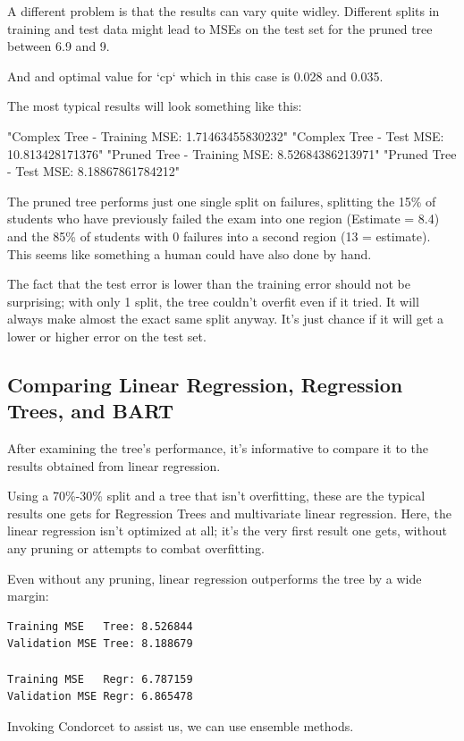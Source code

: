 \documentclass[12pt]{article}
\begin{document}
A different problem is that the results can vary quite widley. Different splits in training and test data might lead to MSEs on the test set for the pruned tree between 6.9 and 9.

And and optimal value for `cp` which in this case is 0.028 and 0.035.


The most typical results will look something like this:

"Complex Tree - Training MSE: 1.71463455830232"
"Complex Tree -     Test MSE: 10.813428171376"
"Pruned Tree  - Training MSE: 8.52684386213971"
"Pruned Tree  -     Test MSE: 8.18867861784212"

The pruned tree performs just one single split on failures, splitting the 15\% of students who have previously failed the exam into one region (Estimate = 8.4) and the 85\% of students with 0 failures into a second region (13 = estimate). This seems like something a human could have also done by hand.

The fact that the test error is lower than the training error should not be surprising; with only 1 split, the tree couldn't overfit even if it tried. It will always make almost the exact same split anyway. It's just chance if it will get a lower or higher error on the test set.



\subsection{Comparing Linear Regression, Regression Trees, and BART}

After examining the tree's performance, it's informative to compare it to the results obtained from linear regression.

Using a 70\%-30\% split and a tree that isn't overfitting, these are the typical results one gets for Regression Trees and multivariate linear regression. Here, the linear regression isn't optimized at all; it's the very first result one gets, without any pruning or attempts to combat overfitting.

Even without any pruning, linear regression outperforms the tree by a wide margin:

\begin{verbatim}
Training MSE   Tree: 8.526844
Validation MSE Tree: 8.188679

Training MSE   Regr: 6.787159
Validation MSE Regr: 6.865478
\end{verbatim}

Invoking Condorcet to assist us, we can use ensemble methods.
\end{document}

